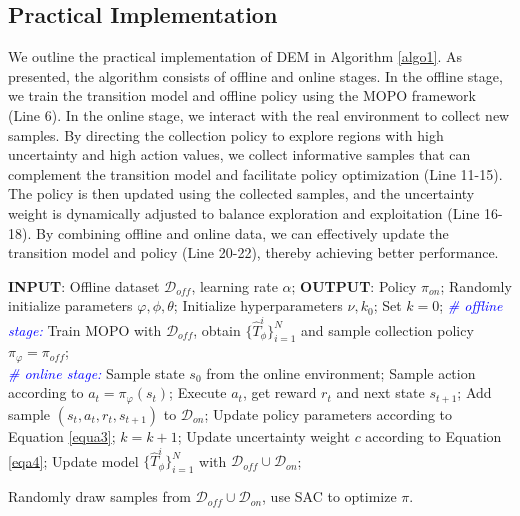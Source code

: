 \documentclass[letterpaper]{article} %
\begin{document}
\subsection{Practical Implementation}
We outline the practical implementation of DEM in Algorithm \ref{algo1}. As presented, the algorithm consists of offline and online stages. In the offline stage, we train the transition model and offline policy using the MOPO framework (Line 6). In the online stage, we interact with the real environment to collect new samples. By directing the collection policy to explore regions with high uncertainty and high action values, we collect informative samples that can complement the transition model and facilitate policy optimization (Line 11-15). The policy is then updated using the collected samples, and the uncertainty weight is dynamically adjusted to balance exploration and exploitation (Line 16-18). By combining offline and online data, we can effectively update the transition model and policy (Line 20-22), thereby achieving better performance.


\begin{algorithm}[!tb]
\caption{Offline-to-Online Reinforcement Learning with Directed Exploration Models(DEM)}
\begin{algorithmic}[1]
  \STATE \textbf{INPUT}: Offline dataset $\mathcal{D}_{off}$, learning rate $\alpha$;
    \STATE \textbf{OUTPUT}: Policy $\pi_{on}$;
    \STATE Randomly initialize parameters $\varphi, \phi, \theta$;
    \STATE Initialize hyperparameters $\nu, k_0$; Set $k=0$;
    \STATE \textcolor{blue}{\textit{\# offline stage:}}
    \STATE Train MOPO with $\mathcal{D}_{off}$, obtain $\{\hat{T}_\phi^i\}_{i=1}^N$ and sample collection policy $\pi_{\varphi} = \pi_{off}$; \\
    \STATE \textcolor{blue}{\textit{\# online stage:}}
            \STATE Sample state $s_0$ from the online environment;
              \STATE Sample action according to $a_t = \pi_{\varphi}(s_t)$;
              \STATE Execute $a_t$, get reward $r_t$ and next state $s_{t+1}$;
              \STATE Add sample $(s_t, a_t, r_t, s_{t+1})$ to $\mathcal{D}_{on}$;
            \ENDFOR
            \STATE Update policy parameters according to Equation \ref{equa3};
            \STATE $k=k+1$;
            \STATE Update uncertainty weight $c$ according to Equation \ref{eqa4};
        \ENDFOR
        \STATE Update model $\{\hat{T}_\phi^i\}_{i=1}^N$ with $\mathcal{D}_{off} \cup \mathcal{D}_{on}$;


    \ENDFOR
    \STATE Randomly draw samples from $\mathcal{D}_{off} \cup \mathcal{D}_{on}$, use SAC to optimize $\pi$.
    \end{algorithmic}
    \label{algo1}
\end{algorithm}
\end{document}
